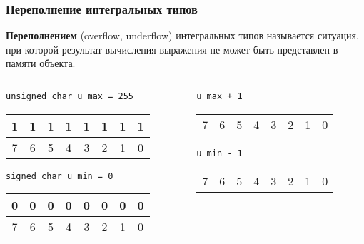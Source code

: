 \documentclass[compress, 8pt]{beamer}
\newenvironment{eightbit}{%
    \begin{center}
        \begin{tabular}{ |m{0.2cm}|m{0.2cm}|m{0.2cm}|m{0.2cm}|m{0.2cm}|m{0.2cm}|m{0.2cm}|m{0.2cm}|  }
            \hline
}{
        \hline
        \multicolumn{1}{c}{\color{gray}\tiny{7}} &
        \multicolumn{1}{c}{\color{gray}\tiny{6}} &
        \multicolumn{1}{c}{\color{gray}\tiny{5}} &
        \multicolumn{1}{c}{\color{gray}\tiny{4}} &
        \multicolumn{1}{c}{\color{gray}\tiny{3}} &
        \multicolumn{1}{c}{\color{gray}\tiny{2}} &
        \multicolumn{1}{c}{\color{gray}\tiny{1}} &
        \multicolumn{1}{c}{\color{gray}\tiny{0}} \\
        \end{tabular}
    \end{center}
}
\begin{document}
\begin{frame}[fragile]

    \frametitle{Переполнение интегральных типов}

    \textbf{Переполнением} (overflow, underflow) интегральных типов
    называется ситуация, при которой результат вычисления выражения
    не может быть представлен в памяти объекта.

    \hfill \break

    \begin{columns}[T]

        \begin{column}{0.5\textwidth}

            \verb|unsigned char u_max = 255|

            \begin{eightbit}
                1 & 1 & 1 & 1 & 1 & 1 & 1 & 1 \\
            \end{eightbit}

            \verb|signed char u_min = 0|

            \begin{eightbit}
                0 & 0 & 0 & 0 & 0 & 0 & 0 & 0 \\
            \end{eightbit}

        \end{column}

        \begin{column}{0.5\textwidth}

            \verb|u_max + 1|

            \begin{eightbit}
                \color{red}{?} &
                \color{red}{?} &
                \color{red}{?} &
                \color{red}{?} &
                \color{red}{?} &
                \color{red}{?} &
                \color{red}{?} &
                \color{red}{?} \\
            \end{eightbit}

            \verb|u_min - 1|

            \begin{eightbit}
                \color{red}{?} &
                \color{red}{?} &
                \color{red}{?} &
                \color{red}{?} &
                \color{red}{?} &
                \color{red}{?} &
                \color{red}{?} &
                \color{red}{?} \\
            \end{eightbit}

        \end{column}

    \end{columns}

\end{frame}
\end{document}
